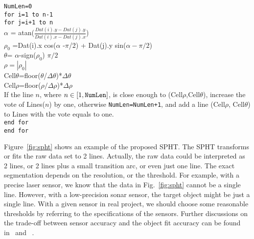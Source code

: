 \documentclass[twocolumn]{IEEEtran}
\begin{document}
{\small \noindent
\texttt{NumLen=0}\\
\texttt{for i=1 to n-1}\\
\hspace*{4mm}    \texttt{for j=i+1 to n} \\
\hspace*{8mm}                $\alpha$ = atan($\frac{ Dat(i).y- Dat(j).y}{Dat(i).x - Dat(j).x} $)\\
\hspace*{8mm}                $\rho_0$ =Dat(i).x cos($\alpha$ -$\pi$/2) + Dat(j).y sin($\alpha-\pi/2$)\\
\hspace*{8mm}                $\theta$= $\alpha$-sign($\rho_0$) $\pi/2$ \\
\hspace*{8mm}                $\rho=|\rho_0|$ \\
\hspace*{8mm}                Cell$\theta$=floor($\theta$/$\Delta\theta$)*$\Delta\theta$ \\
\hspace*{8mm}                Cell$\rho$=floor($\rho/\Delta\rho$)*$\Delta\rho$ \\
\hspace*{8mm}                If the line $n$, where $n\in[1,\mbox{\tt NumLen}]$, is close enough to (Cell$\rho$,Cell$\theta$), increase the vote of Lines($n$) by one, otherwise {\tt NumLen=NumLen+1}, and add a line (Cell$\rho$, Cell$\theta$) to Lines with the vote equals to one.  \\
\hspace*{4mm}    \texttt{end for} \\
\texttt{end for}
}
    
Figure~\ref{fig:spht} shows an example of the proposed SPHT. The SPHT transforms or fits  the raw data set to 2 lines. Actually,  the raw data could be interpreted as 2 lines,  or 2 lines plus a small transition arc, or even just one line. The exact segmentation depends on the resolution, or the threshold. For example, with a  precise laser sensor, we know  that the data in Fig.~\ref{fig:spht} cannot be a single line. However, with a low-precision sonar sensor, the target object might be just a single line. With a given sensor in real project, we should choose some reasonable thresholds by referring to the specifications of the sensors. Further discussions on the trade-off between sensor accuracy and the object fit accuracy can be found in~\cite{Goto98Efficient} and ~\cite{Goto00Design}.
\end{document}
